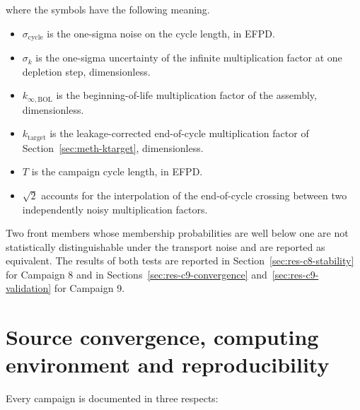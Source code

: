 \begin{enumerate}
        \noindent where the symbols have the following meaning.

        \begin{itemize}
          \item $\sigma_\mathrm{cycle}$ is the one-sigma noise on the
                cycle length, in EFPD.
          \item $\sigma_k$ is the one-sigma uncertainty of the infinite
                multiplication factor at one depletion step,
                dimensionless.
          \item $k_{\infty,\mathrm{BOL}}$ is the beginning-of-life
                multiplication factor of the assembly, dimensionless.
          \item $k_\mathrm{target}$ is the leakage-corrected end-of-cycle
                multiplication factor of Section~\ref{sec:meth-ktarget},
                dimensionless.
          \item $T$ is the campaign cycle length, in EFPD.
          \item $\sqrt{2}$ accounts for the interpolation of the
                end-of-cycle crossing between two independently noisy
                multiplication factors.
        \end{itemize}
\end{enumerate}

Two front members whose membership probabilities are well below one are
not statistically distinguishable under the transport noise and are
reported as
equivalent. The results of both tests are reported in
Section~\ref{sec:res-c8-stability} for Campaign 8 and in
Sections~\ref{sec:res-c9-convergence} and~\ref{sec:res-c9-validation}
for Campaign 9.

\section{Source convergence, computing environment and reproducibility}
\label{sec:meth-diagnostics}

Every campaign is documented in three respects:

